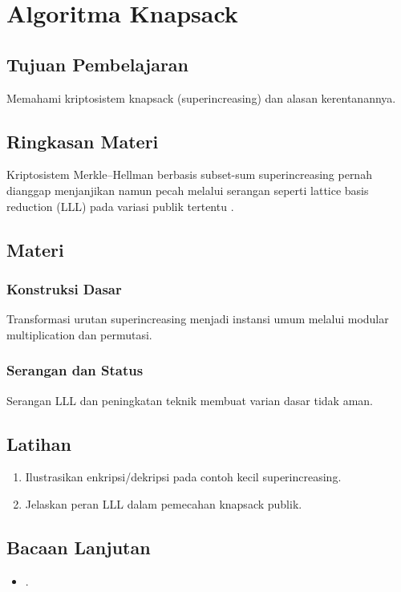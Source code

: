\documentclass[../main.tex]{subfiles}
\begin{document}
\chapter{Algoritma Knapsack}
\section{Tujuan Pembelajaran}
Memahami kriptosistem knapsack (superincreasing) dan alasan kerentanannya.

\section{Ringkasan Materi}
Kriptosistem Merkle--Hellman berbasis subset-sum superincreasing pernah dianggap menjanjikan namun pecah melalui serangan seperti lattice basis reduction (LLL) pada variasi publik tertentu \citep{wikipedia_merkle_hellman}.

\section{Materi}
\subsection{Konstruksi Dasar}
Transformasi urutan superincreasing menjadi instansi umum melalui modular multiplication dan permutasi.

\subsection{Serangan dan Status}
Serangan LLL dan peningkatan teknik membuat varian dasar tidak aman.

\section{Latihan}
\begin{enumerate}
  \item Ilustrasikan enkripsi/dekripsi pada contoh kecil superincreasing.
  \item Jelaskan peran LLL dalam pemecahan knapsack publik.
\end{enumerate}

\section{Bacaan Lanjutan}
\begin{itemize}
  \item \citep{wikipedia_merkle_hellman}.
\end{itemize}
\end{document}
